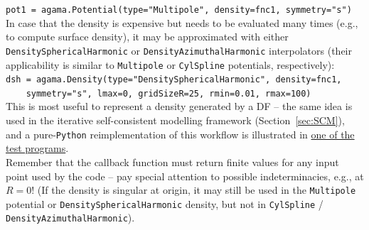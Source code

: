 \documentclass[12pt]{article}
\newcommand{\Python}{\texttt{Python}\xspace}
\newcommand{\ppp}[1]{\textcolor{darkolive} {\texttt{#1}}}
\begin{document}
\texttt{pot1 = agama.Potential(type="Multipole", density=fnc1, symmetry="s")}\\[2mm]
In case that the density is expensive but needs to be evaluated many times (e.g., to compute surface density), it may be approximated with either \ppp{DensitySphericalHarmonic} or \ppp{DensityAzimuthalHarmonic} interpolators (their applicability is similar to \ppp{Multipole} or \ppp{CylSpline} potentials, respectively): \\
\texttt{dsh = agama.Density(type="DensitySphericalHarmonic", density=fnc1, \\
\mbox{}~~~~symmetry="s", lmax=0, gridSizeR=25, rmin=0.01, rmax=100)}\\
This is most useful to represent a density generated by a DF -- the same idea is used in the iterative self-consistent modelling framework (Section~\ref{sec:SCM}), and a pure-\Python reimplementation of this workflow is illustrated in \hyperref[sec:ExampleSCM]{one of the test programs}.\\[2mm]
Remember that the callback function must return finite values for any input point used by the code -- pay special attention to possible indeterminacies, e.g., at $R=0$! (If the density is singular at origin, it may still be used in the \ppp{Multipole} potential or \ppp{DensitySphericalHarmonic} density, but not in \ppp{CylSpline} / \ppp{DensityAzimuthalHarmonic}).
\end{document}
